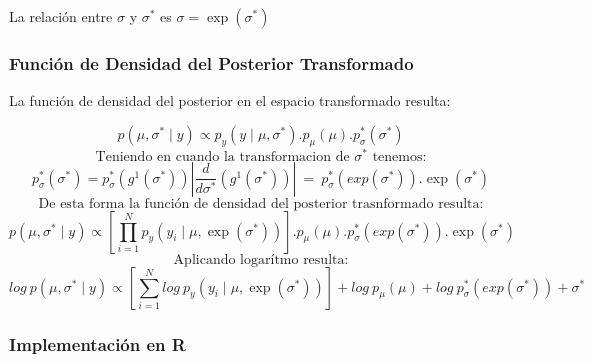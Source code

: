 \documentclass[
]{article}
\begin{document}
La relación entre \(\sigma\) y \(\sigma^*\) es \(\sigma = \exp(\sigma^*)\)

\subsubsection{Función de Densidad del Posterior Transformado}\label{funciuxf3n-de-densidad-del-posterior-transformado}

La función de densidad del posterior en el espacio transformado resulta:

\[p(\mu, \sigma^* \mid y) \propto p_y(y \mid \mu, \sigma^*).p_\mu(\mu).p_\sigma^*(\sigma^*)\]
\[\text{Teniendo en cuando la transformacion de }\sigma^* \text{ tenemos:}\]
\[p_\sigma^*(\sigma^*) = p_\sigma^*(g^1 (\sigma^*)) \left| \dfrac{d}{d\sigma^*} (g^1 (\sigma^*)) \right| \ = \ p_\sigma^*(exp(\sigma^*)).\exp(\sigma^*) \]
\[\text{De esta forma la función de densidad del posterior trasnformado resulta:}\]
\[p(\mu, \sigma^* \mid y) \propto\left[ \prod_{i = 1}^{N} p_y(y_i \mid \mu,\exp(\sigma^*))\right].p_\mu(\mu).p_\sigma^*(exp(\sigma^*)).\exp(\sigma^*)\]
\[\text{Aplicando logarítmo resulta:}\]
\[log\ p(\mu, \sigma^* \mid y) \propto\left[ \sum_{i = 1}^{N} log\ p_y(y_i \mid \mu,\exp(\sigma^*))\right]+log\ p_\mu(\mu)+log\ p_\sigma^*(exp(\sigma^*))+ \sigma^*\]

\newpage

\subsubsection{Implementación en R}\label{implementaciuxf3n-en-r}
\end{document}
